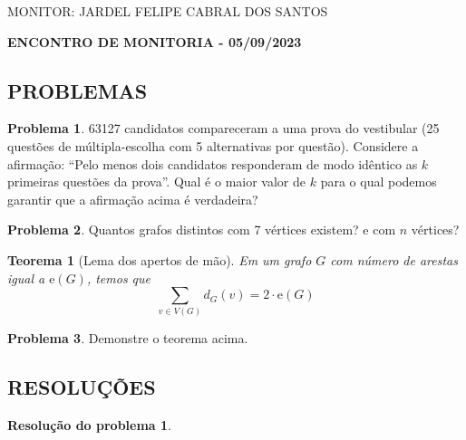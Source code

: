 \documentclass[12pt, a4paper]{article}
\theoremstyle{definition} \newtheorem{prob}{Problema}
\newtheorem{res}{Resolução do problema}
\theoremstyle{plain} \newtheorem*{teo}{Teorema}
\begin{document}
\begin{flushleft}

MONITOR: JARDEL FELIPE CABRAL DOS SANTOS\\[0.75cm] 
\end{flushleft}

\begin{center} \textbf{ENCONTRO DE MONITORIA - 05/09/2023\\[0.75cm]}
\end{center}

\begin{center}
\section*{\normalsize PROBLEMAS\\[0.25cm]} 
\end{center}

\begin{prob}
63127 candidatos compareceram a uma prova do vestibular (25 questões de múltipla-escolha com 5 alternativas por questão). Considere a afirmação: ``Pelo menos dois candidatos responderam de modo idêntico as \(k\) primeiras questões da prova''. Qual é o maior valor de \(k\) para o qual podemos garantir que a afirmação acima é verdadeira?
\end{prob}

\begin{prob}
Quantos grafos distintos com 7 vértices existem? e com \(n\) vértices? 
\end{prob}

\begin{teo}[Lema dos apertos de mão]
Em um grafo \(G\) com número de arestas igual a \(\mathrm{e}(G)\), temos que \[\sum \limits_{v \in V(G)} d_G(v) = 2\cdot{\mathrm{e}(G)}\]
\end{teo}
\begin{prob}
Demonstre o teorema acima.
\end{prob}



\newpage

\begin{center}
\section*{\normalsize RESOLUÇÕES\\[0.25cm]}
\end{center}

\begin{res} %
\end{res}
\end{document}
